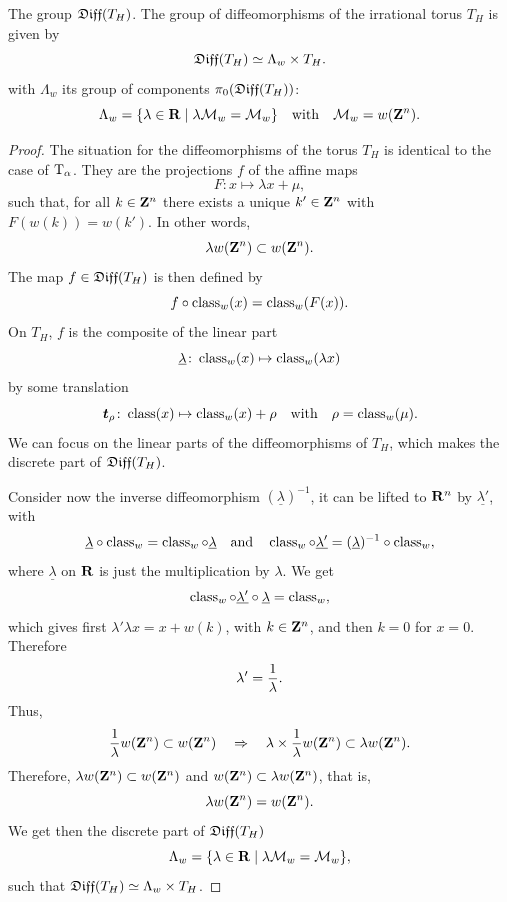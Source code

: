 \begin{Article}{The group $\mathfrak{Diff}(T_H)$.}{\itshape}
  The group of diffeomorphisms of the irrational torus $T_H$ is given by
  $$%
    \Diff(T_H) \simeq \Lambda_w \times T_H.
    $$%
  with $\Lambda_w$ its group of components $\pi_0(\mathfrak{Diff}(T_H))$:
  $$%
    \Lambda_w = \{ \lambda \in \RR \mid \lambda \cM_w = \cM_w \}
    \quad \text{with} \quad
    \cM_w = w(\ZZ^n).
    $$%
\end{Article}

\begin{proof}
  The situation for the diffeomorphisms of the torus $T_H$ is identical to the case of $\mathrm{T}_\alpha$.
  They are the projections $f$ of the affine maps
  $$%
    F \colon x \mapsto \lambda x + \mu,
    $$%
  such that,
  for all $k \in \mathbf{Z}^n$ there exists a unique $k' \in \mathbf{Z}^n$ with $F(w(k)) = w(k')$.
  In other words,
  $$%
    \lambda w(\ZZ^n) \subset w(\ZZ^n).
    $$%
  The map $f \in \mathfrak{Diff}(T_H)$ is then defined by
  $$%
    f \circ \Class_w(x) = \Class_w(F(x)).
    $$%
  On $T_H$,
  $f$ is the composite of the linear part
  $$%
    \underline \lambda \colon \Class_w(x) \mapsto \Class_w(\lambda x)
    $$%
  by some translation
  $$%
    \bmt_\rho \colon \Class(x) \mapsto \Class_w(x) + \rho
    \quad \text{with} \quad
    \rho = \Class_w(\mu).
    $$%
  We can focus on the linear parts of the diffeomorphisms of $T_H$,
  which makes the discrete part of $\mathfrak{Diff}(T_H)$.
  
  Consider now the inverse diffeomorphism $(\underline{\lambda})^{-1}$,
  it can be lifted to $\mathbf{R}^n$ by $\underline{\lambda'}$,
  with
  $$%
    \underline{\lambda} \circ \Class_w = \Class_w \circ \underline{\lambda}
    \quad \text{and} \quad
    \Class_w \circ \underline{\lambda'} = (\underline{\lambda})^{-1} \circ \Class_w,
    $$%
  where $\underline{\lambda}$ on $\mathbf{R}$ is just the multiplication by $\lambda$.
  We get
  $$%
    \Class_w \circ \underline{\lambda'} \circ \underline{\lambda} = \Class_w,
    $$%
  which gives first $\lambda'\lambda x = x + w(k)$,
  with $k \in \mathbf{Z}^n$,
  and then $k=0$ for $x=0$.
  Therefore
  $$%
    \lambda' = {1 \over \lambda}.
    $$%
  Thus,
  $$%
    {1 \over \lambda} w(\ZZ^n) \subset w(\ZZ^n)
    \quad \Rightarrow \quad
    \lambda \times {1 \over \lambda} w(\ZZ^n) \subset \lambda w(\ZZ^n).
    $$%
  Therefore,
  $\lambda w(\mathbf{Z}^n) \subset w(\mathbf{Z}^n)$ and $w(\mathbf{Z}^n) \subset \lambda w(\mathbf{Z}^n)$,
  that is,
  $$%
    \lambda w(\ZZ^n) = w(\ZZ^n).
    $$%
  We get then the discrete part of $\mathfrak{Diff}(T_H)$
  $$%
    \Lambda_w = \{ \lambda \in \RR \mid \lambda \cM_w = \cM_w \},
    $$%
  such that $\mathfrak{Diff}(T_H) \simeq \Lambda_w \times T_H$.
\end{proof}

